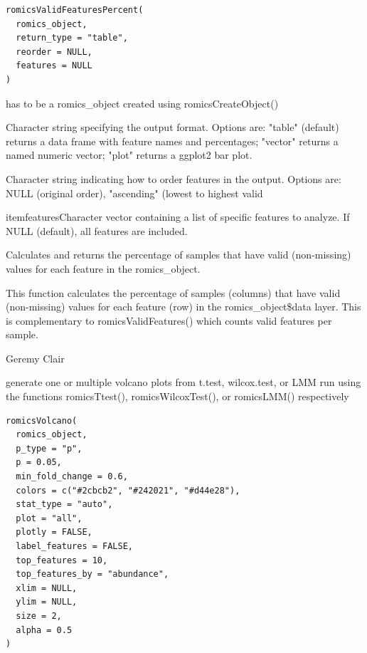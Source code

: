 \documentclass[a4paper]{book}
\begin{document}
%
\begin{Usage}
\begin{verbatim}
romicsValidFeaturesPercent(
  romics_object,
  return_type = "table",
  reorder = NULL,
  features = NULL
)
\end{verbatim}
\end{Usage}
%
\begin{Arguments}
\begin{ldescription}
\item[\code{romics\_object}] has to be a romics\_object created using romicsCreateObject()

\item[\code{return\_type}] Character string specifying the output format. Options are: "table" (default) returns a data frame with feature names and percentages; "vector" returns a named numeric vector; "plot" returns a ggplot2 bar plot.

\item[\code{reorder}] Character string indicating how to order features in the output. Options are: NULL (original order), "ascending" (lowest to highest valid 

\bsl{}itemfeaturesCharacter vector containing a list of specific features to analyze. If NULL (default), all features are included.

\end{ldescription}

Calculates and returns the percentage of samples that have valid (non-missing) values for each feature in the romics\_object.


This function calculates the percentage of samples (columns) that have valid (non-missing) values for each feature (row) in the romics\_object\$data layer. This is complementary to romicsValidFeatures() which counts valid features per sample.


Geremy Clair

\end{Arguments}
%
\begin{Description}
generate one or multiple volcano plots from t.test, wilcox.test, or LMM run using the functions romicsTtest(), romicsWilcoxTest(), or romicsLMM() respectively
\end{Description}
%
\begin{Usage}
\begin{verbatim}
romicsVolcano(
  romics_object,
  p_type = "p",
  p = 0.05,
  min_fold_change = 0.6,
  colors = c("#2cbcb2", "#242021", "#d44e28"),
  stat_type = "auto",
  plot = "all",
  plotly = FALSE,
  label_features = FALSE,
  top_features = 10,
  top_features_by = "abundance",
  xlim = NULL,
  ylim = NULL,
  size = 2,
  alpha = 0.5
)
\end{verbatim}
\end{Usage}
\end{document}
